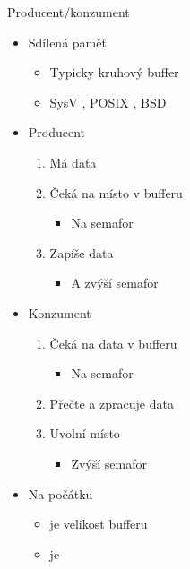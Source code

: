 \begin{frame}{Producent/konzument}

  \begin{itemize}
    \item Sdílená paměť
    \begin{itemize}
      \item Typicky kruhový buffer

      \pause

      \item SysV , POSIX , BSD 
    \end{itemize}

    \pause

    \item Producent
    \begin{enumerate}
      \item Má data

      \pause

      \item Čeká na místo v bufferu
      \begin{itemize}
	\item Na semafor 
      \end{itemize}

      \pause

      \item Zapíše data
      \begin{itemize}
	\item A zvýší semafor 
      \end{itemize}
    \end{enumerate}

    \pause

    \item Konzument
    \begin{enumerate}
      \item Čeká na data v bufferu
      \begin{itemize}
	\item Na semafor 
      \end{itemize}

      \pause

      \item Přečte a zpracuje data

      \pause

      \item Uvolní místo
      \begin{itemize}
	\item Zvýší semafor 
      \end{itemize}
    \end{enumerate}

    \item Na počátku
    \begin{itemize}
      \item {} je velikost bufferu
      \item {} je 
    \end{itemize}
  \end{itemize}

\end{frame}

